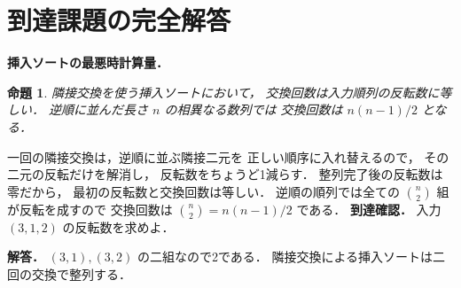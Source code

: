 \documentclass[a5paper,10pt,onecolumn]{jsarticle}
\makeatletter
\theoremstyle{mathnotetheorem}
\newtheorem{proposition}[theorem]{命題}
\renewcommand{\proofname}{証明}
\renewenvironment{proof}[1][\proofname]{%
  \par\pushQED{\qed}\normalfont\topsep4\p@\@plus2\p@\relax
  \trivlist\item[\hskip\labelsep\bfseries #1]\ignorespaces
}{\popQED\endtrivlist\@endpefalse}
\makeatother
\begin{document}
\section{到達課題の完全解答}
\noindent\textbf{挿入ソートの最悪時計算量．}
\begin{proposition}
隣接交換を使う挿入ソートにおいて，
交換回数は入力順列の反転数に等しい．
逆順に並んだ長さ $n$ の相異なる数列では
交換回数は $n(n-1)/2$ となる．
\end{proposition}
\begin{proof}
一回の隣接交換は，逆順に並ぶ隣接二元を
正しい順序に入れ替えるので，
その二元の反転だけを解消し，
反転数をちょうど1減らす．
整列完了後の反転数は零だから，
最初の反転数と交換回数は等しい．
逆順の順列では全ての
$\binom n2$ 組が反転を成すので
交換回数は $\binom n2=n(n-1)/2$ である．
\end{proof}
\noindent\textbf{到達確認．}
入力 $(3,1,2)$ の反転数を求めよ．
\par\noindent\textbf{解答．}
$(3,1),(3,2)$ の二組なので2である．
隣接交換による挿入ソートは二回の交換で整列する．
\end{document}
